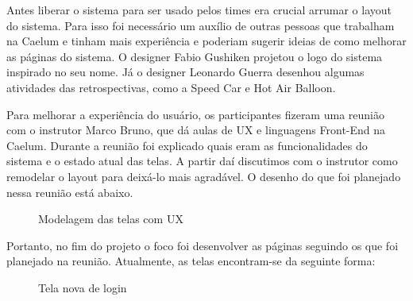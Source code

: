 Antes liberar o sistema para ser usado pelos times era crucial arrumar o layout do sistema. Para isso foi necessário um auxílio de outras pessoas que trabalham na Caelum e tinham mais experiência e poderiam sugerir ideias de como melhorar as páginas do sistema. O designer Fabio Gushiken projetou o logo do sistema inspirado no seu nome. Já o designer Leonardo Guerra desenhou algumas atividades das retrospectivas, como a Speed Car e Hot Air Balloon.

Para melhorar a experiência do usuário, os participantes fizeram uma reunião com o instrutor Marco Bruno, que dá aulas de UX e linguagens Front-End na Caelum. Durante a reunião foi explicado quais eram as funcionalidades do sistema e o estado atual das telas. A partir daí discutimos com o instrutor como remodelar o layout para deixá-lo mais agradável. O desenho do que foi planejado nessa reunião está abaixo.

\begin{figure}[H]
  \centering
  \caption{Modelagem das telas com UX}\label{figura:ux}
\end{figure}

Portanto, no fim do projeto o foco foi desenvolver as páginas seguindo os que foi planejado na reunião. Atualmente, as telas encontram-se da seguinte forma:

\begin{figure}[H]
  \centering
  \caption{Tela nova de login}\label{figura:loginNovo}
\end{figure}

